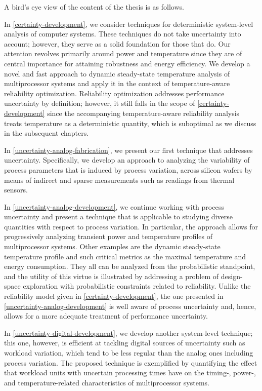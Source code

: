 A bird's eye view of the content of the thesis is as follows.

In \cref{certainty-development}, we consider techniques for deterministic
system-level analysis of computer systems. These techniques do not take
uncertainty into account; however, they serve as a solid foundation for those
that do. Our attention revolves primarily around power and temperature since
they are of central importance for attaining robustness and energy efficiency.
We develop a novel and fast approach to dynamic steady-state temperature
analysis of multiprocessor systems and apply it in the context of
temperature-aware reliability optimization. Reliability optimization addresses
performance uncertainty by definition; however, it still falls in the scope of
\cref{certainty-development} since the accompanying temperature-aware
reliability analysis treats temperature as a deterministic quantity, which is
suboptimal as we discuss in the subsequent chapters.

In \cref{uncertainty-analog-fabrication}, we present our first technique that
addresses uncertainty. Specifically, we develop an approach to analyzing the
variability of process parameters that is induced by process variation, across
silicon wafers by means of indirect and sparse measurements such as readings
from thermal sensors.

In \cref{uncertainty-analog-development}, we continue working with process
uncertainty and present a technique that is applicable to studying diverse
quantities with respect to process variation. In particular, the approach allows
for progressively analyzing transient power and temperature profiles of
multiprocessor systems. Other examples are the dynamic steady-state temperature
profile and such critical metrics as the maximal temperature and energy
consumption. They all can be analyzed from the probabilistic standpoint, and the
utility of this virtue is illustrated by addressing a problem of design-space
exploration with probabilistic constraints related to reliability. Unlike the
reliability model given in \cref{certainty-development}, the one presented in
\cref{uncertainty-analog-development} is well aware of process uncertainty and,
hence, allows for a more adequate treatment of performance uncertainty.

In \cref{uncertainty-digital-development}, we develop another system-level
technique; this one, however, is efficient at tackling digital sources of
uncertainty such as workload variation, which tend to be less regular than the
analog ones including process variation. The proposed technique is exemplified
by quantifying the effect that workload units with uncertain processing times
have on the timing-, power-, and temperature-related characteristics of
multiprocessor systems.

